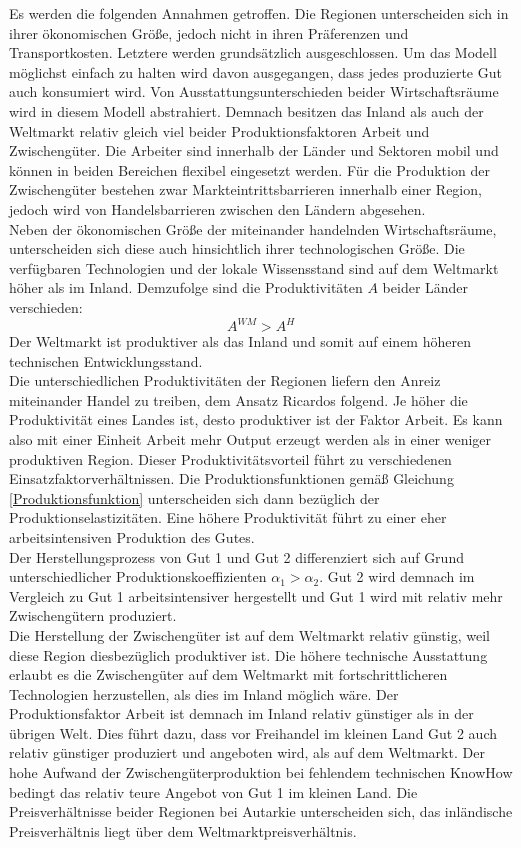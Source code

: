 %
Es werden die folgenden Annahmen getroffen. Die Regionen unterscheiden sich in ihrer ökonomischen Größe, jedoch nicht in ihren Präferenzen und Transportkosten. Letztere  werden grundsätzlich ausgeschlossen. Um das Modell möglichst einfach zu halten wird davon ausgegangen, dass jedes produzierte Gut auch konsumiert wird. Von Ausstattungsunterschieden beider Wirtschaftsräume wird in diesem Modell abstrahiert. Demnach besitzen das Inland als auch der Weltmarkt relativ gleich viel beider Produktionsfaktoren Arbeit und Zwischengüter. Die Arbeiter sind innerhalb der Länder und Sektoren mobil und können in beiden Bereichen flexibel eingesetzt werden. Für die Produktion der Zwischengüter bestehen zwar Markteintrittsbarrieren innerhalb einer Region, jedoch wird von Handelsbarrieren zwischen den Ländern abgesehen.\\
%
Neben der ökonomischen Größe der miteinander handelnden Wirtschaftsräume, unterscheiden sich diese auch hinsichtlich ihrer technologischen Größe. Die verfügbaren Technologien und der lokale Wissensstand sind auf dem Weltmarkt höher als im Inland. Demzufolge sind die Produktivitäten $A$ beider Länder verschieden:
%
	\begin{equation}
		A^{WM}>A^{H}\label{verschiedene A}
	\end{equation}	
%
Der Weltmarkt ist produktiver als das Inland und somit auf einem höheren technischen Entwicklungsstand.\\
Die unterschiedlichen Produktivitäten der Regionen liefern den Anreiz miteinander Handel zu treiben, dem Ansatz Ricardos folgend. Je höher die Produktivität eines Landes ist, desto produktiver ist der Faktor Arbeit. Es kann also mit einer Einheit Arbeit mehr Output erzeugt werden als in einer weniger produktiven Region. Dieser Produktivitätsvorteil führt zu verschiedenen Einsatzfaktorverhältnissen. Die Produktionsfunktionen gemäß Gleichung \eqref{Produktionsfunktion} unterscheiden sich dann bezüglich der Produktionselastizitäten. Eine höhere Produktivität führt zu einer eher arbeitsintensiven Produktion des Gutes.\\  
%
Der Herstellungsprozess von Gut 1 und Gut 2 differenziert sich auf Grund unterschiedlicher Produktionskoeffizienten $\alpha_1 >\alpha_2$. Gut 2 wird demnach im Vergleich zu Gut 1 arbeitsintensiver hergestellt und Gut 1 wird mit relativ mehr Zwischengütern produziert.\\
%
Die Herstellung der Zwischengüter ist auf dem Weltmarkt relativ günstig, weil diese Region diesbezüglich produktiver ist. Die höhere technische Ausstattung erlaubt es die Zwischengüter auf dem Weltmarkt mit fortschrittlicheren Technologien herzustellen, als dies im Inland möglich wäre. Der Produktionsfaktor Arbeit ist demnach im Inland relativ günstiger als in der übrigen Welt. Dies führt dazu, dass vor Freihandel im kleinen Land Gut 2 auch relativ günstiger produziert und angeboten wird, als auf dem Weltmarkt. Der hohe Aufwand der Zwischengüterproduktion bei fehlendem technischen KnowHow bedingt das relativ teure Angebot von Gut 1 im kleinen Land. Die Preisverhältnisse beider Regionen bei Autarkie unterscheiden sich, das inländische Preisverhältnis liegt über dem Weltmarktpreisverhältnis.
